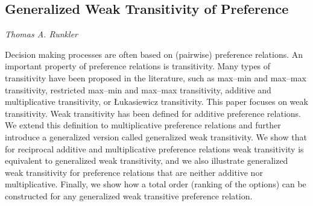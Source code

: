 \documentclass[../booklet.tex]{subfiles}
\begin{document}
\subsection[Generalized Weak Transitivity of Preference. {\it Thomas A. Runkler}]{Generalized Weak Transitivity of Preference}

\begin{center}
  {\it Thomas A. Runkler}
\end{center}



Decision making processes are often based on 
(pairwise) preference relations.
An important property of preference relations
is transitivity.
Many types of transitivity have been proposed in the
literature, such as
max--min and max--max transitivity,
restricted max--min and max--max transitivity,
additive and multiplicative transitivity, or
{\L}ukasiewicz transitivity.
This paper focuses on weak transitivity.
Weak transitivity has been defined 
for additive preference relations.
We extend this definition to multiplicative preference 
relations and further introduce a generalized version called
generalized weak transitivity.
We show that
for reciprocal additive and multiplicative preference relations
weak transitivity is equivalent to
generalized weak transitivity,
and we also illustrate 
generalized weak transitivity
for preference relations that are neither additive nor multiplicative.
Finally,
we show how
a total order (ranking of the options) can
be constructed for any
generalized weak transitive preference relation.
\end{document}
